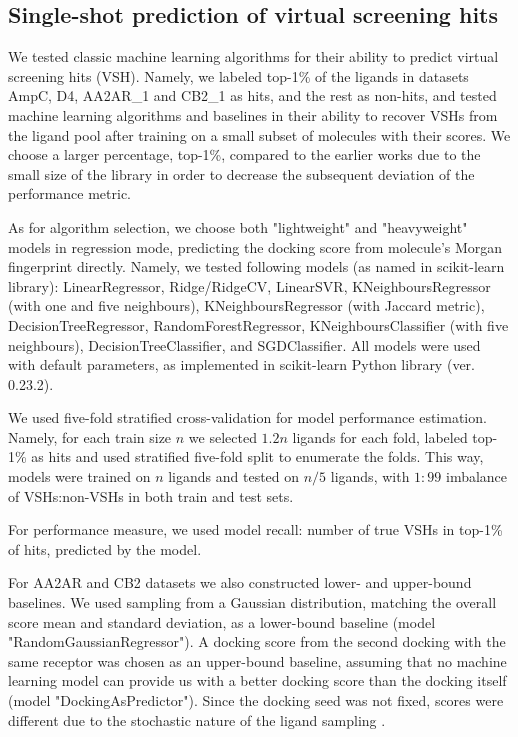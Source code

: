 \subsection{Single-shot prediction of virtual screening hits}
We tested classic machine learning algorithms for their ability to predict virtual screening hits (VSH). Namely, we labeled top-1\% of the ligands in datasets AmpC, D4, AA2AR\_1 and CB2\_1 as hits, and the rest as non-hits, and tested machine learning algorithms and baselines in their ability to recover VSHs from the ligand pool after training on a small subset of molecules with their scores. We choose a larger percentage, top-1\%, compared to the earlier works \cite{Graff2021AcceleratingLearning, logistic_regression, Yang2021_shoichet_active_learning} due to the small size of the library in order to decrease the subsequent deviation of the performance metric.

As for algorithm selection, we choose both "lightweight" and "heavyweight" models in regression mode, predicting the docking score from molecule's Morgan fingerprint directly. Namely, we tested following models (as named in scikit-learn library): LinearRegressor, Ridge/RidgeCV, LinearSVR, KNeighboursRegressor (with one and five neighbours), KNeighboursRegressor (with Jaccard metric), DecisionTreeRegressor, RandomForestRegressor, KNeighboursClassifier (with five neighbours), DecisionTreeClassifier, and SGDClassifier. All models were used with default parameters, as implemented in scikit-learn Python library \cite{scikit-learn} (ver. 0.23.2).

We used five-fold stratified cross-validation for model performance estimation. Namely, for each train size $n$ we selected $1.2n$ ligands for each fold, labeled top-1\% as hits and used stratified five-fold split to enumerate the folds. This way, models were trained on $n$ ligands and tested on $n/5$ ligands, with $1:99$ imbalance of VSHs:non-VSHs in both train and test sets.

For performance measure, we used model recall: number of true VSHs in top-1\% of hits, predicted by the model.

For AA2AR and CB2 datasets we also constructed lower- and upper-bound baselines. We used sampling from a Gaussian distribution, matching the overall score mean and standard deviation, as a lower-bound baseline (model "RandomGaussianRegressor"). A docking score from the second docking with the same receptor was chosen as an upper-bound baseline, assuming that no machine learning model can provide us with a better docking score than the docking itself (model "DockingAsPredictor"). Since the docking seed was not fixed, scores were different due to the stochastic nature of the ligand sampling \cite{abagyan_biased_1994}.

